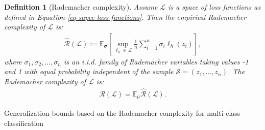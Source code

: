 \documentclass{article}
\newtheorem{definition}{Definition}
\begin{document}
\begin{definition}[Rademacher complexity]
Assume $\mathcal{L}$ is a space of loss functions as defined in Equation \eqref{eq-sapce-loss-functions}.
Then the empirical Rademacher complexity of $\mathcal{L}$ is:
    \begin{align*}
      \hat{\mathcal{R}}(\mathcal{L}):=\mathbb{E}_{\bm \sigma}
      \left[\sup_{\ell_h\in\mathcal{L}}
     \frac{1}{n}\sum_{i=1}^n\sigma_i \ell_{h}(z_i)
          \right],
    \end{align*}
     where $\sigma_1,\sigma_2, \ldots,\sigma_n$
    is an i.i.d. family of Rademacher variables taking values -1 and 1
    with equal probability independent of the sample $\mathcal{S}=(z_1,\ldots,z_n)$.
    The  Rademacher complexity of $\mathcal{L}$ is:
    \begin{align*}
      \mathcal{R}(\mathcal{L})=\mathbb{E}_{\mu}\hat{\mathcal{R}}(\mathcal{L}).
    \end{align*}
\end{definition}
Generalization bounds based on the Rademacher complexity for multi-class classification
\end{document}
